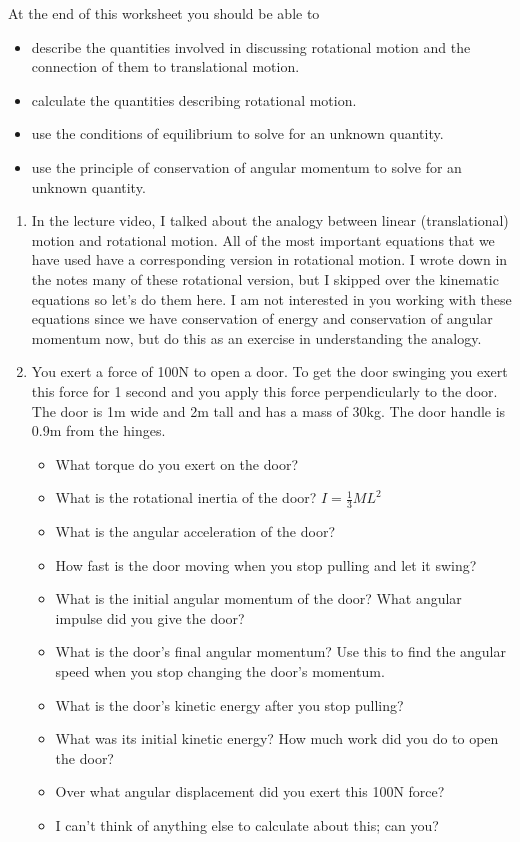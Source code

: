 At the end of this worksheet you should be able to  
\begin{itemize}
	\item describe the quantities involved in discussing rotational motion and the connection of them to translational motion.
	\item calculate the quantities describing rotational motion.
	\item use the conditions of equilibrium to solve for an unknown quantity.
	\item use the principle of conservation of angular momentum to solve for an unknown quantity.
\end{itemize}


\begin{enumerate}
	\setlength\itemsep{1 in}
	
	\item
	In the lecture video, I talked about the analogy between linear (translational) motion and rotational motion. All of the most important equations that we have used have a corresponding version in rotational motion. I wrote down in the notes many of these rotational version, but I skipped over the kinematic equations so let's do them here. I am not interested in you working with these equations since we have conservation of energy and conservation of angular momentum now, but do this as an exercise in understanding the analogy. \bigskip
	
	\item
	You exert a force of 100N to open a door. To get the door swinging you exert this force for 1 second and you apply this force perpendicularly to the door. The door is 1m wide and 2m tall and has a mass of 30kg. The door handle is 0.9m from the hinges. 
	\begin{itemize}
		\setlength\itemsep{1 in}
		\item What torque do you exert on the door?
		\item What is the rotational inertia of the door? $I=\frac{1}{3}ML^2$
		\item What is the angular acceleration of the door?
		\item How fast is the door moving when you stop pulling and let it swing?
		\item What is the initial angular momentum of the door? What angular impulse did you give the door? 
		\item What is the door's final angular momentum? Use this to find the angular speed when you stop changing the door's momentum.
		\item What is the door's kinetic energy after you stop pulling?
		\item What was its initial kinetic energy? How much work did you do to open the door?
		\item Over what angular displacement did you exert this 100N force?
		\item I can't think of anything else to calculate about this; can you?
	\end{itemize}
	

\end{enumerate}
